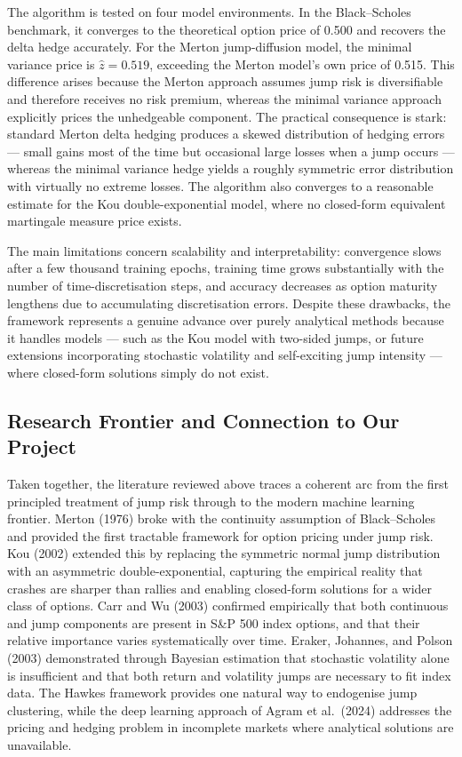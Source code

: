 \documentclass[12pt]{article}
\begin{document}
The algorithm is tested on four model environments. In the Black--Scholes benchmark, it converges to the theoretical option price of 0.500 and recovers the delta hedge accurately. For the Merton jump-diffusion model, the minimal variance price is $\hat{z} = 0.519$, exceeding the Merton model's own price of 0.515. This difference arises because the Merton approach assumes jump risk is diversifiable and therefore receives no risk premium, whereas the minimal variance approach explicitly prices the unhedgeable component. The practical consequence is stark: standard Merton delta hedging produces a skewed distribution of hedging errors --- small gains most of the time but occasional large losses when a jump occurs --- whereas the minimal variance hedge yields a roughly symmetric error distribution with virtually no extreme losses. The algorithm also converges to a reasonable estimate for the Kou double-exponential model, where no closed-form equivalent martingale measure price exists.

The main limitations concern scalability and interpretability: convergence slows after a few thousand training epochs, training time grows substantially with the number of time-discretisation steps, and accuracy decreases as option maturity lengthens due to accumulating discretisation errors. Despite these drawbacks, the framework represents a genuine advance over purely analytical methods because it handles models --- such as the Kou model with two-sided jumps, or future extensions incorporating stochastic volatility and self-exciting jump intensity --- where closed-form solutions simply do not exist.

\subsection*{Research Frontier and Connection to Our Project}

Taken together, the literature reviewed above traces a coherent arc from the first principled treatment of jump risk through to the modern machine learning frontier. Merton (1976) broke with the continuity assumption of Black--Scholes and provided the first tractable framework for option pricing under jump risk. Kou (2002) extended this by replacing the symmetric normal jump distribution with an asymmetric double-exponential, capturing the empirical reality that crashes are sharper than rallies and enabling closed-form solutions for a wider class of options. Carr and Wu (2003) confirmed empirically that both continuous and jump components are present in S\&P 500 index options, and that their relative importance varies systematically over time. Eraker, Johannes, and Polson (2003) demonstrated through Bayesian estimation that stochastic volatility alone is insufficient and that both return and volatility jumps are necessary to fit index data. The Hawkes framework provides one natural way to endogenise jump clustering, while the deep learning approach of Agram et al.\ (2024) addresses the pricing and hedging problem in incomplete markets where analytical solutions are unavailable.
\end{document}
